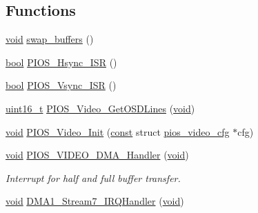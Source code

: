 \subsection*{Functions}
\begin{DoxyCompactItemize}
\item 
\hyperlink{group___n_a_m_e_ga18028b8badbf1ea7e704ccac3c488e82}{void} \hyperlink{group___p_i_o_s___v_i_d_e_o_ga0d157d997329169f936545f9985e334b}{swap\-\_\-buffers} ()
\item 
\hyperlink{group___exported__types_gaf6a258d8f3ee5206d682d799316314b1}{bool} \hyperlink{group___p_i_o_s___v_i_d_e_o_ga80058030e4245438ea8a76bd5c98b133}{P\-I\-O\-S\-\_\-\-Hsync\-\_\-\-I\-S\-R} ()
\item 
\hyperlink{group___exported__types_gaf6a258d8f3ee5206d682d799316314b1}{bool} \hyperlink{group___p_i_o_s___v_i_d_e_o_ga85b37fc7c59ec730520859920f0e1efb}{P\-I\-O\-S\-\_\-\-Vsync\-\_\-\-I\-S\-R} ()
\item 
\hyperlink{stdint_8h_a273cf69d639a59973b6019625df33e30}{uint16\-\_\-t} \hyperlink{group___p_i_o_s___v_i_d_e_o_ga79339656dd43737af275c88061f31458}{P\-I\-O\-S\-\_\-\-Video\-\_\-\-Get\-O\-S\-D\-Lines} (\hyperlink{group___n_a_m_e_ga18028b8badbf1ea7e704ccac3c488e82}{void})
\item 
\hyperlink{group___n_a_m_e_ga18028b8badbf1ea7e704ccac3c488e82}{void} \hyperlink{group___p_i_o_s___v_i_d_e_o_ga1dd937879200d15d16de47a439556adb}{P\-I\-O\-S\-\_\-\-Video\-\_\-\-Init} (\hyperlink{group___n_a_m_e_ga7ae6d0e43244213b34de2c2b9aa30da6}{const} struct \hyperlink{structpios__video__cfg}{pios\-\_\-video\-\_\-cfg} $\ast$cfg)
\item 
\hyperlink{group___n_a_m_e_ga18028b8badbf1ea7e704ccac3c488e82}{void} \hyperlink{group___p_i_o_s___v_i_d_e_o_ga7ceca4d5d94790fa8dc69537bccf004d}{P\-I\-O\-S\-\_\-\-V\-I\-D\-E\-O\-\_\-\-D\-M\-A\-\_\-\-Handler} (\hyperlink{group___n_a_m_e_ga18028b8badbf1ea7e704ccac3c488e82}{void})
\begin{DoxyCompactList}\small\item\em Interrupt for half and full buffer transfer. \end{DoxyCompactList}\item 
\hyperlink{group___n_a_m_e_ga18028b8badbf1ea7e704ccac3c488e82}{void} \hyperlink{group___p_i_o_s___v_i_d_e_o_gae81787590524971351490705554cc351}{D\-M\-A1\-\_\-\-Stream7\-\_\-\-I\-R\-Q\-Handler} (\hyperlink{group___n_a_m_e_ga18028b8badbf1ea7e704ccac3c488e82}{void})
\end{DoxyCompactItemize}
